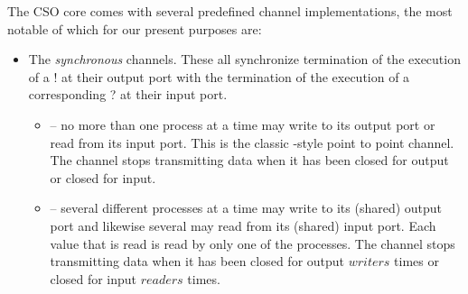 \documentclass[12pt]{IOS-Book-Article-CPA-2017}
\begin{document}
The CSO core comes with several predefined channel implementations, the most
notable of which for our present purposes are:
\begin{itemize}
\item The \textit{synchronous} channels. These all synchronize
      termination of the execution of a ! at their output port with the
      termination of the execution of a corresponding ?  at their
      input port.

\begin{itemize}
\item {}  -- no more than one process at a time
       may write to its output port or read from its input port. This is the classic \occam-style point
       to point channel. The channel stops transmitting data when it has been 
       closed for output or closed for input.
\item {} -- several 
      different processes at a time may write to its (shared) output port and
      likewise several may read from its (shared) input port.  
      Each value that is read is read by only one of the processes. The channel
      stops transmitting data when it has been closed for output $writers$ times
      or closed for input $readers$ times.
\end{itemize}



\end{itemize}
\end{document}
